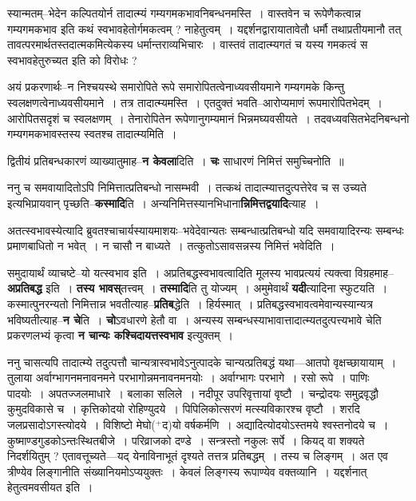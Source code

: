 \documentclass[article,12pt,a4paper]{memoir}
\newcommand{\add}[1]{($^{+}$#1)}
\begin{document}
	  \pstart स्यान्मतम्--भेदेन कल्पितयोर्न तादात्म्यं गम्यगमकभावनिबन्धनमस्ति । वास्तवेन च रूपेणैकत्वान्न गम्यगमकभाव इति कथं स्वभावहेतोर्गमकत्वम् ? नाहेतुत्वम् । यद्दर्शनद्वारायातावेतौ धर्मौ तथाप्रतीयमानौ तत् तावत्परमार्थतस्तदात्मकमित्येकस्य धर्मान्तराव्यभिचारः । वास्तवं तादात्म्यगतं च यस्य गमकत्वं स स्वभावहेतुरुच्यत इति को विरोधः ?
	\pend
      

	  \pstart अयं प्रकरणार्थः--न निश्चयस्थे समारोपिते रूपे समारोपितत्वेनाध्यवसीयमाने गम्यगमके किन्तु स्वलक्षणत्वेनाध्यवसीयमाने । तत्र तादात्म्यमस्ति । एतदुक्तं भवति--आरोप्यमाणं रूपमारोपितभेद\leavevmode{}म् । आरोपितसदृशं च स्वलक्षणम् । तेनारोपितेन रूपेणानुगम्यमानं भिन्नमघ्यवसीयते । तदवध्यवसितभेदनिबन्धनो गम्यगमकभावस्तस्य स्वतश्च तादात्म्यमिति ।
	\pend
      

	  \pstart द्वितीयं प्रतिबन्धकारणं व्याख्यातुमाह--\textbf{न केवला}दिति । \textbf{चः} साधारणं निमित्तं समुच्चिनोति ॥
	\pend
      

	  \pstart ननु च समवायादितोऽपि निमित्तात्प्रतिबन्धो नासम्भवी । तत्कथं तादात्म्यात्तदुत्पत्तेरेव च स उच्यते इत्यभिप्रायवान् पृच्छति--\textbf{कस्मादि}ति । अन्यनिमित्तस्यानभिधाना\textbf{न्निमित्तद्वयादि}त्याह ।
	\pend
      

	  \pstart अतत्स्वभावस्येत्यादि ब्रुवतश्चाचार्यस्यायमाशयः--भवेदेवान्यतः सम्बन्धात्प्रतिबन्धो  \leavevmode{} यदि समवायादिरन्यः सम्बन्धः प्रमाणबाधितो न भवेत् । न चासौ न बाध्यते । तत्कुतोऽसावसन्नस्य निमित्तं भवेदिति ।
	\pend
      

	  \pstart समुदायार्थं व्याचष्टे--यो यत्स्वभाव इति । अप्रतिबद्धस्वभावत्वादिति मूलस्य भावप्रत्ययं त्यक्त्वा विग्रहमाह--\textbf{अप्रतिबद्ध} इति । \textbf{तस्य भावस्}तत्त्वम् । \textbf{तस्मादि}ति तु योज्यम् । अमुमेवार्थं \textbf{यदी}त्यादिना स्फुटयति । कस्मात्पुनरन्यतो निमित्तान्न भवतीत्याह--\textbf{प्रतिब}द्धेति । हिर्यस्मात् । प्रतिबद्धस्वभावत्वमेवान्यस्यान्यत्र भविष्यतीत्याह--\textbf{न चे}ति । \textbf{चो}ऽवधारणे हेतौ वा । अन्यस्य सम्बन्धस्याभावात्तादात्म्यतदुत्पत्त्यभावे चेति प्रकरणलभ्यं कृत्वा \textbf{न चान्यः कश्चिदायत्तस्वभाव} इत्युक्तम् ।
	\pend
      

	  \pstart ननु चासत्यपि तादात्म्ये तदुत्पत्तौ चान्यत्रास्वभावेऽनुत्पादके चान्यत्प्रतिबद्धं यथा—आतपो वृक्षच्छायायाम् । तुलाया अर्वाग्भागनमनावनमने परभागोन्नमनावनमनयोः । अर्वाग्भागः परभागे । रसो रूपे । पाणिः पादयोः । अपतज्जलमाधारे । बलाका सलिले । नदीपूर उपरिवृत्तायां वृष्टौ । चन्द्रोदयः समुद्रवृद्धौ कुमुदविकासे च । कृत्तिकोदयो रोहिण्युदये । पिपिलिकोत्सरणं मत्स्यविकारश्च वृष्टौ । शरदि जलप्रसादोऽगस्त्योदये । विशिष्टो मेघो\add{द}यो वर्षकर्मणि । अद्यादित्योदयोऽस्तमये श्वस्तनोदये च । कुष्माण्डगुडकोऽन्तःस्थितबीजे । परिव्राजको दण्डे । सन्त्रस्तो नकुलः सर्पे । कियद् वा शक्यते निदर्शयितुम् ? एतावत्तूच्यते—यद् येनाविनाभूतं दृश्यते तत्तत्र प्रतिबद्धम् । तस्य च लिङ्गम् । अत एव त्रीण्येव लिङ्गानीति संख्यानियमोऽप्ययुक्तः । केवलं लिङ्गस्य रूपाण्येव वक्तव्यानि । यद्दर्शनात् हेतुत्वमवसीयत इति ।
	\pend
      
\end{document}
